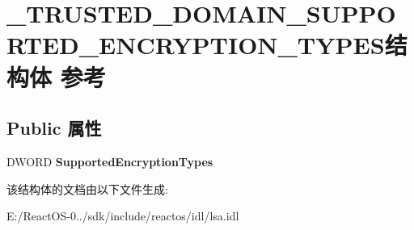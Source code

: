 \hypertarget{struct___t_r_u_s_t_e_d___d_o_m_a_i_n___s_u_p_p_o_r_t_e_d___e_n_c_r_y_p_t_i_o_n___t_y_p_e_s}{}\section{\+\_\+\+T\+R\+U\+S\+T\+E\+D\+\_\+\+D\+O\+M\+A\+I\+N\+\_\+\+S\+U\+P\+P\+O\+R\+T\+E\+D\+\_\+\+E\+N\+C\+R\+Y\+P\+T\+I\+O\+N\+\_\+\+T\+Y\+P\+E\+S结构体 参考}
\label{struct___t_r_u_s_t_e_d___d_o_m_a_i_n___s_u_p_p_o_r_t_e_d___e_n_c_r_y_p_t_i_o_n___t_y_p_e_s}
\subsection*{Public 属性}
\begin{DoxyCompactItemize}
\item 
\mbox{\label{struct___t_r_u_s_t_e_d___d_o_m_a_i_n___s_u_p_p_o_r_t_e_d___e_n_c_r_y_p_t_i_o_n___t_y_p_e_s_a86982045d67637c977b28d0e4005f03d}} 
D\+W\+O\+RD {\bfseries Supported\+Encryption\+Types}
\end{DoxyCompactItemize}


该结构体的文档由以下文件生成\+:\begin{DoxyCompactItemize}
\item 
E\+:/\+React\+O\+S-\/0../sdk/include/reactos/idl/lsa.\+idl\end{DoxyCompactItemize}
